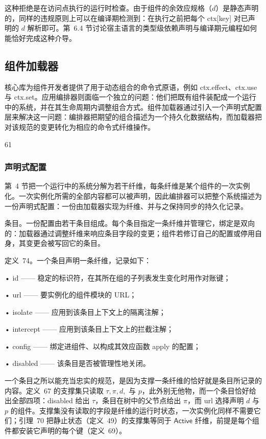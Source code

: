 \documentclass[
  10
]{article}
\begin{document}
这种拒绝是在访问点执行的运行时检查。由于组件的余效应规格（\(d\)）是静态声明的，同样的违规原则上可以在编译期检测到：在执行之前把每个 ctx{[}key{]} 对已声明的 \(d\) 解析即可。第~6.4 节讨论宿主语言的类型级依赖声明与编译期元编程如何能恰好完成这种介导。
\subsection{组件加载器} \label{component-loader}

核心库为组件开发者提供了用于动态组合的命令式原语，例如 ctx.effect、ctx.use 与 ctx.set。应用编排器则面临一个独立的问题：他们把既有组件装配成一个运行中的系统，并在其生命周期内调整组合方式。组件加载器通过引入一个声明式配置层来解决这一问题：编排器把期望的组合描述为一个持久化数据结构，而加载器把对该规范的变更转化为相应的命令式纤维操作。

61

\subsubsection{声明式配置} \label{declarative-configuration}

第~4 节把一个运行中的系统分解为若干纤维，每条纤维是某个组件的一次实例化。一次实例化所需的全部内容都可以被声明，因此编排器可以把整个系统描述为一份声明式配置：一份由加载器实现为纤维、并与之保持同步的持久化记录。

条目。一份配置由若干条目组成。每个条目指定一条纤维并管理它，绑定是双向的：加载器通过调整纤维来响应条目字段的变更；组件若修订自己的配置或停用自身，其变更会被写回它的条目。

定义~74。一个条目声明一条纤维，记录如下：

• id —— 稳定的标识符，在其所在组的子列表发生变化时用作对账键；

• url —— 要实例化的组件模块的 URL；

• isolate —— 应用到该条目上下文上的隔离注解；

• intercept —— 应用到该条目上下文上的拦截注解；

• config —— 绑定进组件、以构成其效应函数 apply 的配置；

• disabled —— 该条目是否被管理性地关闭。

一个条目之所以能充当忠实的规范，是因为支撑一条纤维的恰好就是条目所记录的内容。定义~67 的支撑集只读取 \(\tau , \pi , d ,\) 与 \(p\)，此外别无他物，而一个条目恰好给出全部四项：disabled 给出 \(\tau\)，条目在树中的父节点给出 \(\pi\)，而 url 选择声明 \(d\) 与 \(p\) 的组件。支撑集没有读取的字段是纤维的运行时状态，一次实例化同样不需要它们；引理~70 把静止状态（定义~49）的支撑集等同于 \(\mathsf{Active}\) 纤维，前提是每个组件都安装它声明的每个键（定义~69）。
\end{document}
